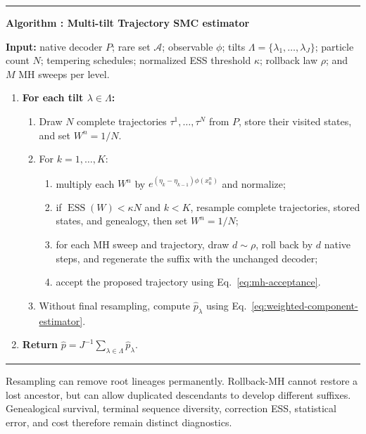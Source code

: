 \documentclass{article}
\newcommand{\ESS}{\operatorname{ESS}}
\newcounter{algorithm}
\begin{document}
\label{alg:complete}
\noindent\rule{\linewidth}{0.5pt}
\noindent\textbf{Algorithm \thealgorithm: Multi-tilt Trajectory SMC estimator}

\smallskip
\noindent\textbf{Input:} native decoder $P$; rare set $\mathcal A$;
observable $\phi$; tilts $\Lambda=\{\lambda_1,\ldots,\lambda_J\}$; particle
count $N$; tempering schedules; normalized ESS threshold $\kappa$; rollback
law $\rho$; and $M$ MH sweeps per level.

\begin{enumerate}[leftmargin=*,label=\textbf{\arabic*.},itemsep=3pt,topsep=3pt]
    \item \textbf{For each tilt $\lambda\in\Lambda$:}
    \begin{enumerate}[leftmargin=2em,label=\alph*.,itemsep=2pt,topsep=2pt]
        \item Draw $N$ complete trajectories $\tau^1,\ldots,\tau^N$ from
        $P$, store their visited states, and set $W^n=1/N$.
        \item For $k=1,\ldots,K$:
        \begin{enumerate}[leftmargin=2em,label=\roman*.,itemsep=1pt,topsep=1pt]
            \item multiply each $W^n$ by
            $e^{(\eta_k-\eta_{k-1})\phi(x^n_0)}$ and normalize;
            \item if $\ESS(W)<\kappa N$ and $k<K$, resample complete
            trajectories, stored states, and genealogy, then set $W^n=1/N$;
            \item for each MH sweep and trajectory, draw $d\sim\rho$, roll
            back by $d$ native steps, and regenerate the suffix with the
            unchanged decoder;
            \item accept the proposed trajectory using
            Eq.~\eqref{eq:mh-acceptance}.
        \end{enumerate}
        \item Without final resampling, compute $\widehat p_\lambda$ using
        Eq.~\eqref{eq:weighted-component-estimator}.
    \end{enumerate}
    \item \textbf{Return}
    $\widehat p=J^{-1}\sum_{\lambda\in\Lambda}\widehat p_\lambda$.
\end{enumerate}
\noindent\rule{\linewidth}{0.5pt}

Resampling can remove root lineages permanently. Rollback-MH cannot restore a
lost ancestor, but can allow duplicated descendants to develop different
suffixes. Genealogical survival, terminal sequence diversity, correction ESS,
statistical error, and cost therefore remain distinct diagnostics.
\end{document}
